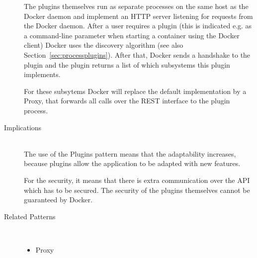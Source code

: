 \begin{description}
The plugins themselves run as separate processes on the same host as the Docker daemon and implement an HTTP server listening for requests from the Docker daemon. After a user requires a plugin (this is indicated e.g. as a command-line parameter when starting a container using the Docker client) Docker uses the discovery algorithm (see also Section~\ref{sec:processplugins}). After that, Docker sends a handshake to the plugin and the plugin returns a list of which subsystems this plugin implements.

For these subsytems Docker will replace the default implementation by a Proxy, that forwards all calls over the REST interface to the plugin process.

\item [Implications]~\\
The use of the Plugins pattern means that the adaptability increases, because plugins allow the application to be adapted with new features.

For the security, it means that there is extra communication over the API which has to be secured. The security of the plugins themselves cannot be guaranteed by Docker.

\item [Related Patterns]~
\begin{itemize}
\item Proxy
\end{itemize}
\end{description}

